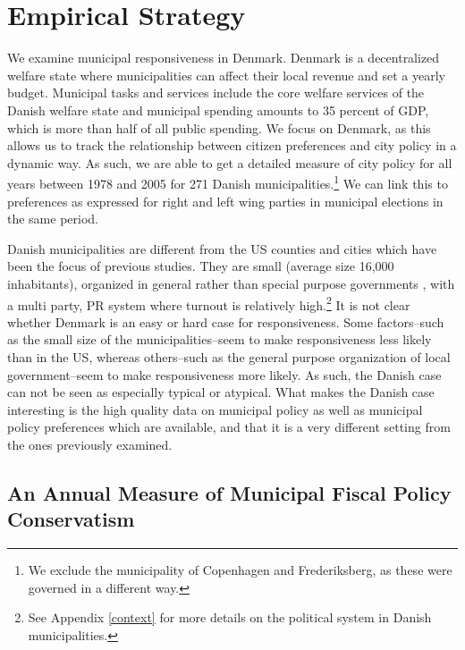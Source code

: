 \documentclass[a4paper,12pt]{article}
\begin{document}
\section*{Empirical Strategy}

 We examine municipal responsiveness in Denmark. Denmark is a decentralized welfare state where municipalities can affect their local revenue and set a yearly budget.  Municipal tasks and services include the core welfare services of the Danish welfare state and municipal spending amounts to 35 percent of GDP, which is more than half of all public spending. We focus on Denmark, as this allows us to track the relationship between citizen preferences and city policy in a dynamic way. As such, we are able to get a detailed measure of city policy for all years between 1978 and 2005 for 271 Danish municipalities.\footnote{We exclude the municipality of Copenhagen and Frederiksberg, as these were governed in a different way.}  We can link this to preferences as expressed for right and left wing parties in municipal elections in the same period.
 
 

Danish municipalities are different from the US counties and cities which have been the focus of previous studies. They are small (average size 16,000 inhabitants), organized in general rather than special purpose governments \citep{berry2009imperfect}, with a multi party, PR system where turnout is relatively high.\footnote{See Appendix \ref{context} for more details on the political system in Danish municipalities.} It is not clear whether Denmark is an easy or hard case for responsiveness.  Some factors--such as the small size of the municipalities--seem to make responsiveness less likely than in the US, whereas others--such as the general purpose organization of local government--seem to make responsiveness more likely. As such, the Danish case can not be seen as especially typical or atypical. What makes the Danish case interesting is the high quality data on municipal policy as well as municipal policy preferences which are available, and that it is a very different setting from the ones previously examined.


\subsection*{An Annual Measure of Municipal Fiscal Policy Conservatism}
\end{document}
